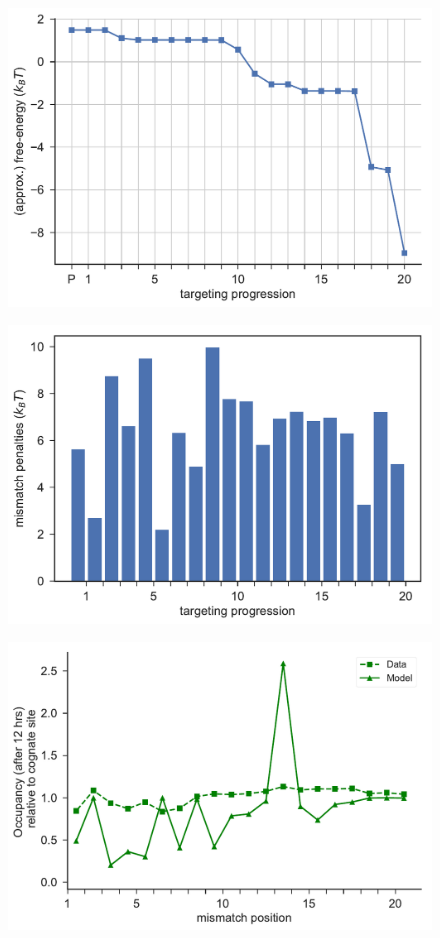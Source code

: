 \documentclass[a4paper,twoside]{revtex4-1}
\begin{document}
\begin{figure}[H]
\includegraphics[scale=0.5]{fig15_10_10_2018.pdf}
\end{figure}


\begin{figure}[H]
\includegraphics[scale=0.5]{fig16_10_10_2018.pdf}
\end{figure}

\begin{figure}[H]
\includegraphics[scale=0.5]{fig17_10_10_2018.pdf}
\end{figure}
\end{document}
